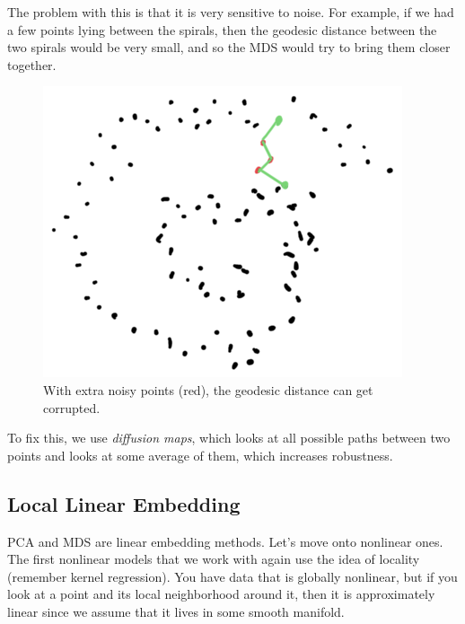     The problem with this is that it is very sensitive to noise. For example, if we had a few points lying between the spirals, then the geodesic distance between the two spirals would be very small, and so the MDS would try to bring them closer together.  

    \begin{figure}[H]
      \centering 
      \includegraphics[scale=0.4]{img/isomap_problem.png}
      \caption{With extra noisy points (red), the geodesic distance can get corrupted.} 
      \label{fig:isomap_problem}
    \end{figure}

    To fix this, we use \textit{diffusion maps}, which looks at all possible paths between two points and looks at some average of them, which increases robustness. 

  \subsection{Local Linear Embedding} 

    PCA and MDS are linear embedding methods. Let's move onto nonlinear ones. The first nonlinear models that we work with again use the idea of locality (remember kernel regression). You have data that is globally nonlinear, but if you look at a point and its local neighborhood around it, then it is approximately linear since we assume that it lives in some smooth manifold. 

